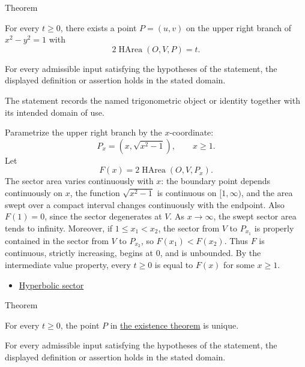 \begin{theorembox}{Theorem}
\begin{theorem}
\label{thm:hyperbolic-sector-existence}
For every $t\geq 0$, there exists a point $P=(u,v)$ on the upper right branch
of $x^2-y^2=1$ with
\[
  2\operatorname{HArea}(O,V,P)=t.
\]
\end{theorem}
\end{theorembox}
\begin{remark*}
For every admissible input satisfying the hypotheses of the statement, the
displayed definition or assertion holds in the stated domain.
\end{remark*}

\begin{remark*}[Interpretation]
The statement records the named trigonometric object or identity together with
its intended domain of use.
\end{remark*}

\begin{remark*}[Proof]
Parametrize the upper right branch by the $x$-coordinate:
\[
  P_x=(x,\sqrt{x^2-1}),\qquad x\geq 1.
\]
Let
\[
  F(x)=2\operatorname{HArea}(O,V,P_x).
\]
The sector area varies continuously with $x$: the boundary point depends
continuously on $x$, the function $\sqrt{x^2-1}$ is continuous on
$[1,\infty)$, and the area swept over a compact interval changes continuously
with the endpoint. Also $F(1)=0$, since the sector degenerates at $V$.
As $x\to\infty$, the swept sector area tends to infinity. Moreover, if
$1\leq x_1<x_2$, the sector from $V$ to $P_{x_1}$ is properly contained in
the sector from $V$ to $P_{x_2}$, so $F(x_1)<F(x_2)$. Thus $F$ is continuous,
strictly increasing, begins at $0$, and is unbounded. By the intermediate
value property, every $t\geq 0$ is equal to $F(x)$ for some $x\geq 1$.
\end{remark*}
\begin{dependencies}
\begin{itemize}
  \item \hyperref[def:hyperbolic-sector]{Hyperbolic sector}
\end{itemize}
\end{dependencies}

\begin{theorembox}{Theorem}
\begin{theorem}
\label{thm:hyperbolic-sector-uniqueness}
For every $t\geq 0$, the point $P$ in
\hyperref[thm:hyperbolic-sector-existence]{the existence theorem} is unique.
\end{theorem}
\end{theorembox}
\begin{remark*}
For every admissible input satisfying the hypotheses of the statement, the
displayed definition or assertion holds in the stated domain.
\end{remark*}

